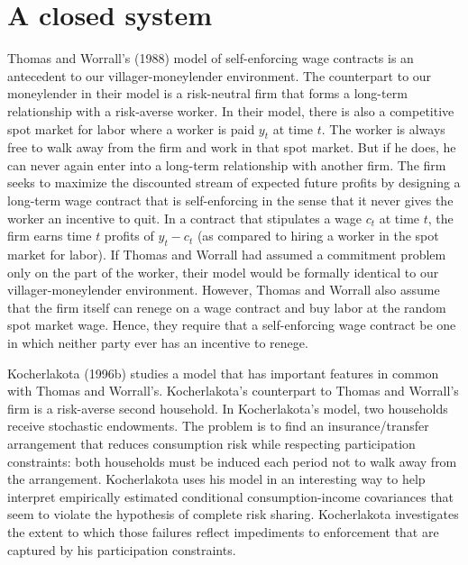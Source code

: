\section{A closed system}\label{sec:closed}%
Thomas and Worrall's (1988) model
%
of self-enforcing wage contracts is an
antecedent to our villager-moneylender environment.
  The counterpart to our moneylender  in their model is  a risk-neutral firm that forms a long-term relationship
with a risk-averse worker. In their model, there is also a competitive spot
market for labor where a worker is paid $y_t$ at time $t$. The
worker is always free to walk away from the firm and work in that
spot market.  But if he does, he can never again enter into a long-term
relationship with another firm.  The firm seeks to maximize the
discounted stream of expected future profits by designing a
long-term wage contract that is self-enforcing in the sense that it never gives
the worker
an incentive to quit.  In a contract that
stipulates a wage $c_t$ at time $t$, the firm earns time $t$
profits of $y_t - c_t$
(as compared to hiring a worker in the spot market for labor).
If Thomas and Worrall had assumed a commitment problem only on the part of
the worker, their model  would be formally identical to our
villager-moneylender environment.
  However, Thomas and Worrall also assume that
the firm itself can renege on a wage contract and buy labor at the
random spot market wage. Hence, they require that a self-enforcing wage contract
 be one in which neither party ever has an incentive to
renege.

Kocherlakota
%
(1996b) studies a model that has important features in common with
Thomas and Worrall's. %
 Kocherlakota's  counterpart to Thomas and Worrall's   firm is  a  risk-averse second household.
  In Kocherlakota's  model, two
 households
receive stochastic endowments. The  problem
is  to find an insurance/transfer arrangement that reduces
consumption risk while respecting participation constraints: both households must be induced each period not
to walk away from the arrangement. Kocherlakota
uses his model in an interesting way to help interpret empirically
estimated conditional consumption-income covariances that seem to
violate the hypothesis of complete risk sharing. Kocherlakota
investigates the extent to which those failures reflect
impediments to enforcement that are captured by his participation
constraints. 


